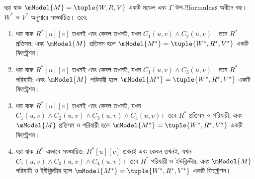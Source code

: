 \documentclass[../../../include/open-logic-section]{subfiles}
\begin{document}
\begin{thm}
  ধরা যাক $\mModel{M} =\tuple{W,R,V}$ একটি মডেল এবং $\Gamma$ উপ-!!{formula}sর অধীনে বদ্ধ। $W^*$ ও $V^*$  অনুসারে সংজ্ঞায়িত। তবে:
  \begin{enumerate}
  \item ধরা যাক $R^*[u][v]$ তখনই এবং কেবল তখনই, যখন $C_1(u, v) \land
    C_2(u,v)$। তবে $R^*$ প্রতিসম; এবং $\mModel{M}$ প্রতিসম হলে $\mModel{M^*} =
    \tuple{W^*,R^*,V^*}$ একটি ফিল্ট্রেশন।
  \item ধরা যাক $R^*[u][v]$ তখনই এবং কেবল তখনই, যখন $C_1(u, v)
    \land C_3(u,v)$। তবে $R^*$ পরিযায়ী; এবং $\mModel{M}$ পরিযায়ী হলে $\mModel{M^*}=\tuple{W^*,R^*,V^*}$ একটি ফিল্ট্রেশন।
  \item ধরা যাক $R^*[u][v]$ তখনই এবং কেবল তখনই, যখন $C_1(u, v) \land C_2(u,v)
    \land C_3(u,v) \land C_4(u,v)$। তবে $R^*$ প্রতিসম ও পরিযায়ী; এবং $\mModel{M}$ প্রতিসম ও পরিযায়ী হলে $\mModel{M^*}=\tuple{W^*,R^*,V^*}$ একটি ফিল্ট্রেশন।
  \item ধরা যাক $R^*$ এভাবে সংজ্ঞায়িত: $R^*[u][v]$ তখনই এবং কেবল তখনই, যখন $C_1(u,
    v) \land C_3(u,v) \land C_4(u,v)$। তবে $R^*$ পরিযায়ী ও ইউক্লিডীয়; এবং $\mModel{M}$ পরিযায়ী ও ইউক্লিডীয় হলে $\mModel{M^*}=\tuple{W^*,R^*,V^*}$ একটি ফিল্ট্রেশন।
  \end{enumerate}
\end{thm}
\end{document}
